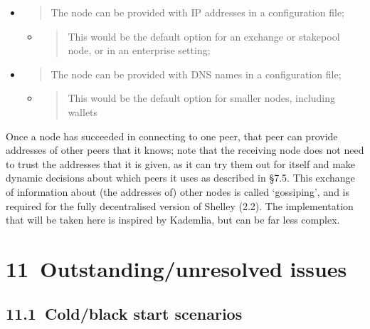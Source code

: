 \documentclass[11pt,a4paper]{article}
\begin{document}
\begin{itemize}
\item
  \begin{quote}
  The node can be provided with IP addresses in a configuration file;
  \end{quote}

  \begin{itemize}
  \item
    \begin{quote}
    This would be the default option for an exchange or stakepool node,
    or in an enterprise setting;
    \end{quote}
  \end{itemize}
\item
  \begin{quote}
  The node can be provided with DNS names in a configuration file;
  \end{quote}

  \begin{itemize}
  \item
    \begin{quote}
    This would be the default option for smaller nodes, including
    wallets
    \end{quote}
  \end{itemize}
\end{itemize}

Once a node has succeeded in connecting to one peer, that peer can
provide addresses of other peers that it knows; note that the receiving
node does not need to trust the addresses that it is given, as it can
try them out for itself and make dynamic decisions about which peers it
uses as described in §7.5. This exchange of information about (the
addresses of) other nodes is called `gossiping', and is required for the
fully decentralised version of Shelley (2.2). The implementation that
will be taken here is inspired by Kademlia, but can be far less complex.

\hypertarget{outstandingunresolved-issues}{%
\section{​11​~Outstanding/unresolved
issues}\label{outstandingunresolved-issues}}

\hypertarget{coldblack-start-scenarios}{%
\subsection{​11.1​~Cold/black start
scenarios}\label{coldblack-start-scenarios}}
\end{document}
